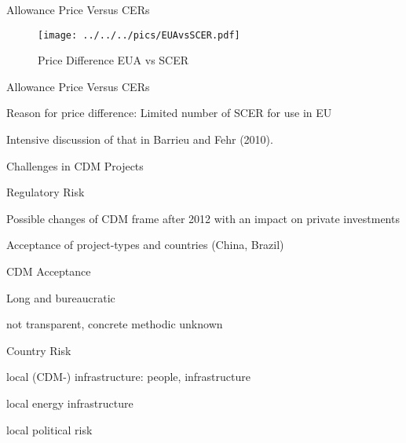 {Allowance Price Versus CERs}
\begin{figure}[h!]
\centering
\texttt{[image: ../../../pics/EUAvsSCER.pdf]}
\caption{Price Difference EUA vs SCER}
\label{fig:EUAvsSCER}
\end{figure}

{Allowance Price Versus CERs}






	Reason for price difference: Limited number of SCER for use in EU


	Intensive discussion of that in Barrieu and Fehr (2010).





{Challenges in CDM Projects}






	Regulatory  Risk






	Possible changes of CDM frame after 2012 with an impact on private investments


	Acceptance of project-types and countries (China, Brazil)






	CDM Acceptance






	Long and bureaucratic


	not transparent, concrete methodic unknown






	Country Risk






	local (CDM-) infrastructure: people, infrastructure


	local energy infrastructure


	local political risk










